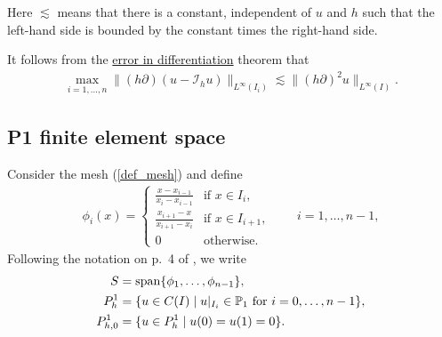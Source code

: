 \documentclass[12pt,oneside,final]{amsart}
\def\I{\mathcal I}
\DeclareMathOperator{\linspan}{span}
\begin{document}
Here $\lesssim$ means that there is a constant, independent of $u$ and $h$ such that the left-hand side is bounded by the constant times the right-hand side.

It follows from the \href{https://nbviewer.org/github/uh-comp-methods1/notebooks/blob/main/interpolation/lecture.ipynb#Theorem:-error-in-differentiation}{error in differentiation} theorem that 
    \begin{align}\label{eq_err_in_diff}
\max_{i=1,\dots,n}\|(h\partial)(u - \I_h u)\|_{L^\infty(I_i)} \lesssim \|(h \partial)^2 u\|_{L^\infty(I)}.
    \end{align}

\subsection{P1 finite element space}

Consider the mesh (\ref{def_mesh}) and define 
    \begin{align}\label{def_P1_basis}
\phi_i(x) = \begin{cases}
\frac{x - x_{i-1}}{x_i - x_{i-1}} & \text{if $x \in I_i$},
\\
\frac{x_{i+1} - x}{x_{i+1} - x_i} & \text{if $x \in I_{i+1}$},
\\
0 & \text{otherwise}.
\end{cases}
\qquad i = 1,\dots,n-1,
    \end{align}
Following the notation on p.~4 of \cite{EG}, we write
    \begin{align}\label{def_S}
S &= \linspan \{ \phi_1,\dots,\phi_{n-1} \},
\\\notag
P^1_{h} &= \{ u \in C(I) \mid \text{$u|_{I_{i}} \in \mathbb P_1$ for $i=0,\dots,n-1$} \},
\\\notag
P^1_{h,0} &= \{ u \in P^1_{h} \mid u(0) = u(1) = 0 \}.
    \end{align}
\end{document}
